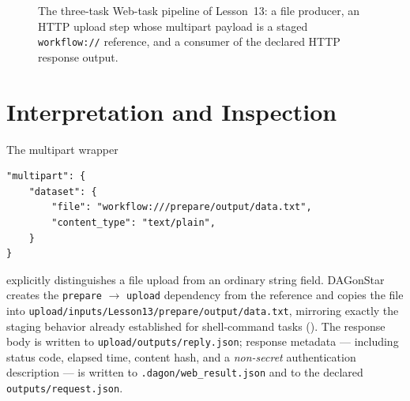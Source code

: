 \begin{figure}[h]
\centering
{}
\caption{The three-task Web-task pipeline of Lesson~13: a file producer, an
HTTP upload step whose multipart payload is a staged \texttt{workflow://}
reference, and a consumer of the declared HTTP response output.}
\label{fig:web-task-flow}
\end{figure}

\section{Interpretation and Inspection}

The multipart wrapper

\begin{lstlisting}
"multipart": {
    "dataset": {
        "file": "workflow:///prepare/output/data.txt",
        "content_type": "text/plain",
    }
}
\end{lstlisting}

explicitly distinguishes a file upload from an ordinary string field.
DAGonStar creates the \texttt{prepare} $\to$ \texttt{upload} dependency from
the reference and copies the file into
\texttt{upload/inputs/Lesson13/prepare/output/data.txt}, mirroring exactly
the staging behavior already established for shell-command tasks
(). The response body is written to
\texttt{upload/outputs/reply.json}; response metadata --- including status
code, elapsed time, content hash, and a \emph{non-secret} authentication
description --- is written to \texttt{.dagon/web\_result.json} and to the
declared \texttt{outputs/request.json}.

